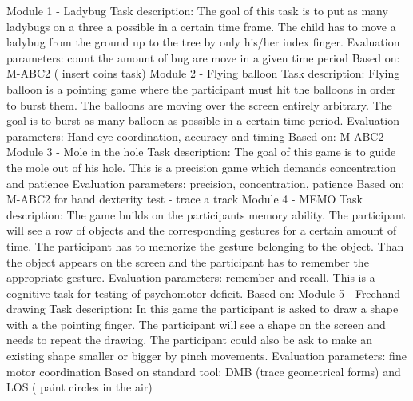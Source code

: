 \vspace{5mm} %
\hfill \break
Module 1 - Ladybug\newline
Task description: The goal of this task is to put as many ladybugs on a three a possible in a certain time frame. The child has to move a ladybug from the ground up to the tree by only his/her index finger.
Evaluation parameters: count the amount of bug are move in a given time period
Based on: M-ABC2 ( insert coins task)
\vspace{5mm} %
\hfill \break
Module 2 - Flying balloon\newline
Task description: Flying balloon is a pointing game where the participant must hit the balloons in order to burst them. The balloons are moving over the screen entirely arbitrary. The goal is to burst as many balloon as possible in a certain time period.
Evaluation parameters: Hand eye coordination, accuracy and timing
Based on: M-ABC2 
\vspace{5mm} %
\hfill \break
Module 3 - Mole in the hole\newline
Task description: The goal of this game is to guide the mole out of his hole. This is a precision game which demands concentration and patience 
Evaluation parameters:  precision, concentration, patience 
Based on: M-ABC2 for hand dexterity test - trace a track
\vspace{5mm} %
\hfill \break
Module 4 - MEMO \newline
Task description: The game builds on the participants memory ability.  The participant will see a row of objects and the corresponding gestures for a certain amount of time. The participant has to memorize the gesture belonging to the object. Than the object appears on the screen and the participant has to remember the appropriate gesture. 
Evaluation parameters: remember and recall. This is a cognitive task for testing of psychomotor deficit.
Based on:
\vspace{5mm} %
\hfill \break
Module 5 - Freehand drawing\newline
Task description: In this game the participant is asked to draw a shape with a the pointing finger.  The participant will see a shape on the screen and needs to repeat the drawing. The participant could also be ask to make an existing shape smaller or bigger by pinch movements.
Evaluation parameters: fine motor coordination
Based on standard tool: DMB (trace geometrical forms) and LOS ( paint circles in the air)

